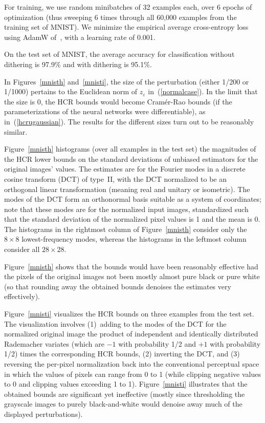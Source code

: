 \documentclass[]{fairmeta}
\renewcommand{\epsilon}{\varepsilon}
\begin{document}
For training, we use random minibatches of 32 examples each,
over 6 epochs of optimization (thus sweeping 6 times
through all 60,000 examples from the training set of MNIST).
We minimize the empirical average cross-entropy loss
using AdamW of~\cite{loshchilov-hutter}, with a learning rate of 0.001.

On the test set of MNIST, the average accuracy for classification
without dithering is 97.9\% and with dithering is 95.1\%.

In Figures~\ref{mnisth} and~\ref{mnisti}, the size of the perturbation
(either 1/200 or 1/1000) pertains to the Euclidean norm of $z_{\epsilon}$
in~(\ref{normalcase}). In the limit that the size is 0, the HCR bounds
would become Cram\'er-Rao bounds (if the parameterizations
of the neural networks were differentiable), as in~(\ref{hcrugaussian}).
The results for the different sizes turn out to be reasonably similar.

Figure~\ref{mnisth} histograms (over all examples in the test set)
the magnitudes of the HCR lower bounds on the standard deviations
of unbiased estimators for the original images' values.
The estimates are for the Fourier modes in a discrete cosine transform (DCT)
of type~II, with the DCT normalized to be an orthogonal linear transformation
(meaning real and unitary or isometric).
The modes of the DCT form an orthonormal basis suitable as a system
of coordinates; note that these modes are for the normalized input images,
standardized such that the standard deviation of the normalized pixel values
is 1 and the mean is 0. The histograms in the rightmost column
of Figure~\ref{mnisth} consider only the $8 \times 8$ lowest-frequency modes,
whereas the histograms in the leftmost column consider all $28 \times 28$.

Figure~\ref{mnisth} shows that the bounds would have been reasonably effective
had the pixels of the original images not been mostly almost pure black
or pure white (so that rounding away the obtained bounds denoises the estimates
very effectively).

Figure~\ref{mnisti} visualizes the HCR bounds on three examples
from the test set. The visualization involves
(1)~adding to the modes of the DCT for the normalized original image
the product of independent and identically distributed Rademacher variates
(which are $-1$ with probability 1/2 and $+1$ with probability 1/2)
times the corresponding HCR bounds, (2) inverting the DCT,
and (3) reversing the per-pixel normalization back into the conventional
perceptual space in which the values of pixels can range from 0 to 1
(while clipping negative values to 0 and clipping values exceeding 1 to 1).
Figure~\ref{mnisti} illustrates that the obtained bounds are significant
yet ineffective (mostly since thresholding the grayscale images
to purely black-and-white would denoise away much
of the displayed perturbations).
\end{document}
